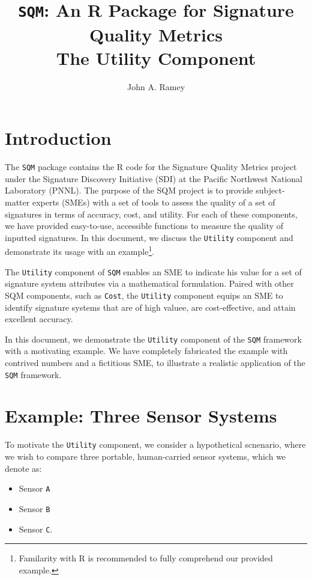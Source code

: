 \documentclass{article}
\title{{\tt SQM}: An R Package for Signature Quality Metrics\\The Utility Component}
\author{John A. Ramey}
\begin{document}
\maketitle

\section{Introduction}

The {\tt SQM} package contains the R code for the Signature Quality Metrics project
under the Signature Discovery Initiative (SDI) at the Pacific Northwest National
Laboratory (PNNL). The purpose of the SQM project is to provide subject-matter
experts (SMEs) with a set of tools to assess the quality of a set of signatures
in terms of accuracy, cost, and utility. For each of these components, we
have provided easy-to-use, accessible functions to measure the quality of
inputted signatures. In this document, we discuss the {\tt Utility} component
and demonstrate its usage with an example\footnote{Familarity with R
is recommended to fully comprehend our provided example.}.

The {\tt Utility} component of {\tt SQM} enables an SME to indicate his value
for a set of signature system attributes via a mathematical formulation. Paired
with other SQM components, such as {\tt Cost}, the {\tt Utility} component
equips an SME to identify signature systems that are of high valuee, are cost-effective,
and attain excellent accuracy.

In this document, we demonstrate the {\tt Utility} component of the {\tt SQM}
framework with a motivating example. We have completely fabricated the example
with contrived numbers and a fictitious SME, to illustrate a realistic
application of the {\tt SQM} framework.

\section{Example: Three Sensor Systems}

To motivate the {\tt Utility} component, we consider a hypothetical scnenario,
where we wish to compare three portable, human-carried sensor systems, which we
denote as:

\begin{itemize}
  \item Sensor {\tt A}
  \item Sensor {\tt B}
  \item Sensor {\tt C}.
\end{itemize}
\end{document}
